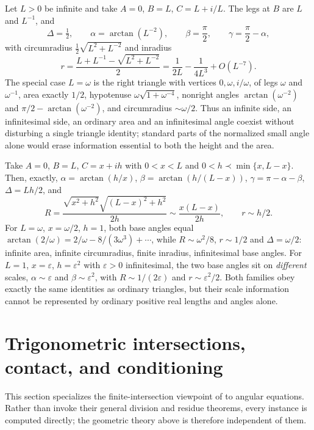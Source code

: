 \documentclass[11pt,letterpaper]{article}
\numberwithin{equation}{section}
\theoremstyle{definition}
\theoremstyle{remark}
\newcommand{\eps}{\varepsilon}
\begin{document}
\begin{example}\label{trigonometry:ex:infinite}
Let $L>0$ be infinite and take $A=0$, $B=L$, $C=L+i/L$. The legs at $B$ are $L$ and $L^{-1}$, and
\[
 \Delta=\tfrac12,\qquad \alpha=\arctan(L^{-2}),\qquad\beta=\frac\pi2,\qquad
 \gamma=\frac\pi2-\alpha,
\]
with circumradius $\frac12\sqrt{L^2+L^{-2}}$ and inradius
\[
 r=\frac{L+L^{-1}-\sqrt{L^2+L^{-2}}}2=\frac1{2L}-\frac1{4L^3}+O(L^{-7}).
\]
The special case $L=\omega$ is the right triangle with vertices $0,\omega,i/\omega$, of legs
$\omega$ and $\omega^{-1}$, area exactly $1/2$, hypotenuse $\omega\sqrt{1+\omega^{-4}}$, nonright
angles $\arctan(\omega^{-2})$ and $\pi/2-\arctan(\omega^{-2})$, and circumradius $\sim\omega/2$.
Thus an infinite side, an infinitesimal side, an ordinary area and an infinitesimal angle coexist
without disturbing a single triangle identity; standard parts of the normalized small angle alone
would erase information essential to both the height and the area.
\end{example}

\begin{example}
\label{trigonometry:ex:hierarchies}
Take $A=0$, $B=L$, $C=x+ih$ with $0<x<L$ and $0<h\prec\min\{x,L-x\}$. Then, exactly,
$\alpha=\arctan(h/x)$, $\beta=\arctan(h/(L-x))$, $\gamma=\pi-\alpha-\beta$, $\Delta=Lh/2$, and
\[
 R=\frac{\sqrt{x^2+h^2}\sqrt{(L-x)^2+h^2}}{2h}\sim\frac{x(L-x)}{2h},\qquad r\sim h/2 .
\]
For $L=\omega$, $x=\omega/2$, $h=1$, both base angles equal
$\arctan(2/\omega)=2/\omega-8/(3\omega^3)+\cdots$, while $R\sim\omega^2/8$, $r\sim1/2$ and
$\Delta=\omega/2$: infinite area, infinite circumradius, finite inradius, infinitesimal base
angles. For $L=1$, $x=\eps$, $h=\eps^2$ with $\eps>0$ infinitesimal, the two base angles sit on
\emph{different} scales, $\alpha\sim\eps$ and $\beta\sim\eps^2$, with $R\sim1/(2\eps)$ and
$r\sim\eps^2/2$. Both families obey exactly the same identities as ordinary triangles, but their
scale information cannot be represented by ordinary positive real lengths and angles alone.
\end{example}

\section{Trigonometric intersections, contact, and conditioning}
\label{trigonometry:sec:contact}

This section specializes the finite-intersection viewpoint of
\cite{SourceGeometry,SourceIntersections} to angular equations. Rather than invoke their general
division and residue theorems, every instance is computed directly; the geometric theory above is
therefore independent of them.
\end{document}
